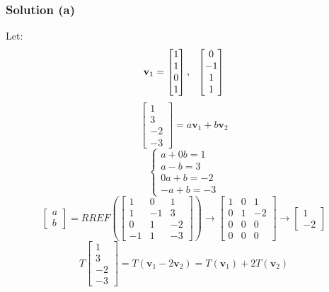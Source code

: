 \documentclass[12pt]{article}
\begin{document}
\subsubsection*{Solution (a)}
Let:
\[
  \textbf{v}_1 = \begin{bmatrix}
    1\\ 
    1\\ 
    0\\ 
    1 
  \end{bmatrix}, \hspace{0.1in} \begin{bmatrix}
  0\\ 
  -1\\ 
  1\\ 
  1 
\end{bmatrix}
\]
\[
  \begin{bmatrix}
    1\\ 
    3\\ 
    -2\\ 
    -3 
  \end{bmatrix} = a\textbf{v}_1 + b\textbf{v}_2 
\]
\[
  \begin{cases}
    a + 0b = 1\\ 
    a - b = 3\\ 
    0a + b = -2\\ 
    -a + b = -3 
  \end{cases}
\]
\[
  \begin{bmatrix}
    a\\ 
    b 
  \end{bmatrix} = RREF\left(\begin{bmatrix}
  1 & 0 & 1\\ 
  1 & -1 & 3\\ 
  0 & 1 & -2\\ 
  -1 & 1 & -3 
  \end{bmatrix}\right) \longrightarrow \begin{bmatrix}
  1 & 0 & 1\\ 
  0 & 1 & -2\\ 
  0 & 0 & 0\\ 
  0 & 0 & 0 
  \end{bmatrix} \longrightarrow \begin{bmatrix}
  1\\ 
  -2 
\end{bmatrix}
\]
\[
  T\begin{bmatrix}
    1\\ 
    3\\ 
    -2\\ 
    -3 
  \end{bmatrix} = T(\textbf{v}_1 - 2\textbf{v}_2) = T(\textbf{v}_1) + 2T(\textbf{v}_2)
\]
\end{document}
